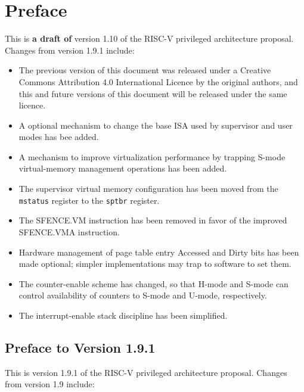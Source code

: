 \chapter{Preface}

This is {\bf a draft of} version 1.10 of the RISC-V privileged
architecture proposal.  Changes from version 1.9.1 include:

\begin{itemize}
  \parskip 0pt
  \itemsep 1pt
\item The previous version of this document was released under a
  Creative Commons Attribution 4.0 International Licence by the
  original authors, and this and future versions of this document will
  be released under the same licence.
\item A optional mechanism to change the base ISA used by supervisor and user
      modes has bee added.
\item A mechanism to improve virtualization performance by
      trapping S-mode virtual-memory management operations has been added.
\item The supervisor virtual memory configuration has been moved from the
      {\tt mstatus} register to the {\tt sptbr} register.
\item The SFENCE.VM instruction has been removed in favor of the improved
      SFENCE.VMA instruction.
\item Hardware management of page table entry Accessed and Dirty bits has
      been made optional; simpler implementations may trap to software to
      set them.
\item The counter-enable scheme has changed, so that H-mode and S-mode can
      control availability of counters to S-mode and U-mode, respectively.
\item The interrupt-enable stack discipline has been simplified.
\end{itemize}

\section*{Preface to Version 1.9.1}

This is version 1.9.1 of the RISC-V privileged architecture
proposal.  Changes from version 1.9 include:

